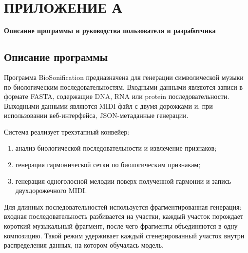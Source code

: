 \appendix

\clearpage
{}
\chapter*{ПРИЛОЖЕНИЕ А}
\label{appendix:program-guides}

\begin{center}
\textbf{Описание программы и руководства пользователя и разработчика}
\end{center}

\setcounter{section}{0}
\setcounter{subsection}{0}
\setcounter{subsubsection}{0}
\setcounter{table}{0}
\renewcommand{\thesection}{А.\arabic{section}}
\renewcommand{\thesubsection}{\thesection.\arabic{subsection}}
\renewcommand{\thesubsubsection}{\thesubsection.\arabic{subsubsection}}
\renewcommand{\thetable}{А.\arabic{table}}

\section{Описание программы}

Программа BioSonification предназначена для генерации символической музыки по биологическим последовательностям. Входными данными являются записи в формате FASTA, содержащие DNA, RNA или protein последовательности. Выходными данными являются MIDI-файл с двумя дорожками и, при использовании веб-интерфейса, JSON-метаданные генерации.

Система реализует трехэтапный конвейер:
\begin{enumerate}
\item анализ биологической последовательности и извлечение признаков;
\item генерация гармонической сетки по биологическим признакам;
\item генерация одноголосной мелодии поверх полученной гармонии и запись двухдорожечного MIDI.
\end{enumerate}

Для длинных последовательностей используется фрагментированная генерация: входная последовательность разбивается на участки, каждый участок порождает короткий музыкальный фрагмент, после чего фрагменты объединяются в одну композицию. Такой режим удерживает каждый сгенерированный участок внутри распределения данных, на котором обучалась модель.

